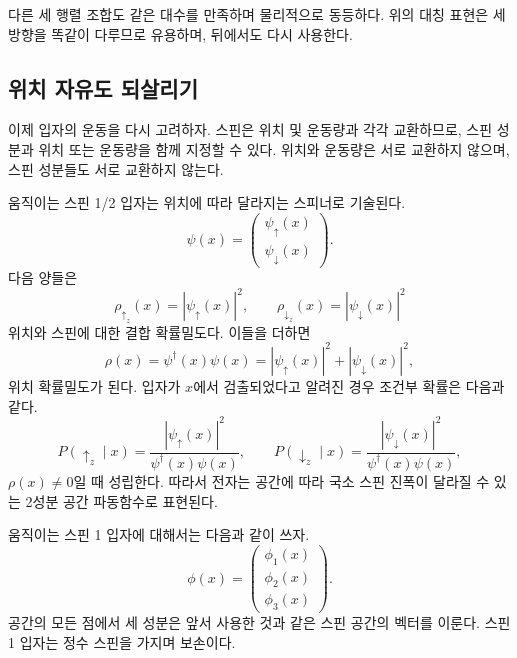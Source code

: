 다른 세 행렬 조합도 같은 대수를 만족하며 물리적으로 동등하다. 위의 대칭 표현은 세 방향을 똑같이 다루므로 유용하며, 뒤에서도 다시 사용한다.

\subsection{위치 자유도 되살리기}

이제 입자의 운동을 다시 고려하자. 스핀은 위치 및 운동량과 각각 교환하므로, 스핀 성분과 위치 또는 운동량을 함께 지정할 수 있다. 위치와 운동량은 서로 교환하지 않으며, 스핀 성분들도 서로 교환하지 않는다.

움직이는 스핀 1/2 입자는 위치에 따라 달라지는 스피너로 기술된다.
\begin{equation}
\psi(x)=
\begin{pmatrix}
\psi_\uparrow(x)\\
\psi_\downarrow(x)
\end{pmatrix}.
\end{equation}
다음 양들은
\begin{equation}
\rho_{\uparrow_z}(x)=|\psi_\uparrow(x)|^2,
\qquad
\rho_{\downarrow_z}(x)=|\psi_\downarrow(x)|^2
\end{equation}
위치와 스핀에 대한 결합 확률밀도다. 이들을 더하면
\begin{equation}
\rho(x)=\psi^\dagger(x)\psi(x)
=|\psi_\uparrow(x)|^2+|\psi_\downarrow(x)|^2,
\end{equation}
위치 확률밀도가 된다. 입자가 \(x\)에서 검출되었다고 알려진 경우 조건부 확률은 다음과 같다.
\begin{equation}
P(\uparrow_z\mid x)
=
\frac{|\psi_\uparrow(x)|^2}{\psi^\dagger(x)\psi(x)},
\qquad
P(\downarrow_z\mid x)
=
\frac{|\psi_\downarrow(x)|^2}{\psi^\dagger(x)\psi(x)},
\end{equation}
\(\rho(x)\neq0\)일 때 성립한다. 따라서 전자는 공간에 따라 국소 스핀 진폭이 달라질 수 있는 2성분 공간 파동함수로 표현된다.

움직이는 스핀 1 입자에 대해서는 다음과 같이 쓰자.
\begin{equation}
\phi(x)=
\begin{pmatrix}
\phi_1(x)\\
\phi_2(x)\\
\phi_3(x)
\end{pmatrix}.
\end{equation}
공간의 모든 점에서 세 성분은 앞서 사용한 것과 같은 스핀 공간의 벡터를 이룬다. 스핀 1 입자는 정수 스핀을 가지며 보손이다.

\begin{classroomqa}
\end{classroomqa}

